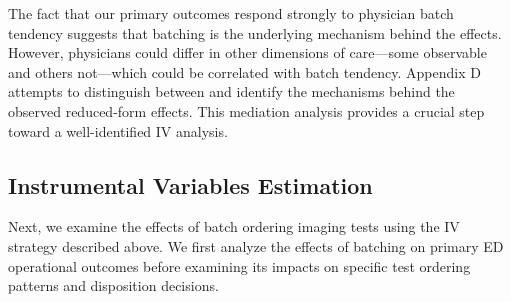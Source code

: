 \documentclass[,,nonblindrev]{informs}
\begin{document}
The fact that our primary outcomes respond strongly to physician batch
tendency suggests that batching is the underlying mechanism behind the
effects. However, physicians could differ in other dimensions of
care---some observable and others not---which could be correlated with
batch tendency. Appendix D attempts to distinguish between and identify
the mechanisms behind the observed reduced-form effects. This mediation
analysis provides a crucial step toward a well-identified IV analysis.

\subsection{Instrumental Variables
Estimation}\label{instrumental-variables-estimation}

Next, we examine the effects of batch ordering imaging tests using the
IV strategy described above. We first analyze the effects of batching on
primary ED operational outcomes before examining its impacts on specific
test ordering patterns and disposition decisions.
\end{document}
